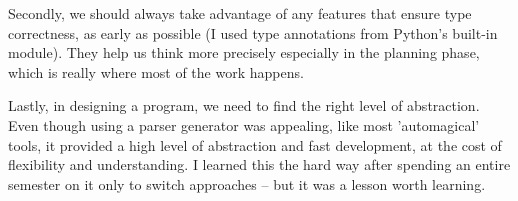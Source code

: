 Secondly, we should always take advantage of any features that ensure type correctness, as early as possible (I used type annotations from Python's built-in  module). They help us think more precisely especially in the planning phase, which is really where most of the work happens.

Lastly, in designing a program, we need to find the right level of abstraction. Even though using a parser generator was appealing, like most 'automagical' tools, it provided a high level of abstraction and fast development, at the cost of flexibility and understanding. I learned this the hard way after spending an entire semester on it only to switch approaches – but it was a lesson worth learning.